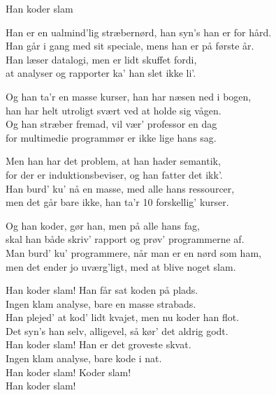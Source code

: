 \begin{song}{Han koder slam}
  \begin{SBVerse}
    Han er en ualmind'lig stræbernørd, han syn's han er for hård.\\
    Han går i gang med sit speciale, mens han er på første år.\\
    Han læser datalogi, men er lidt skuffet fordi,\\
    at analyser og rapporter ka' han slet ikke li'.
  \end{SBVerse}

  \begin{SBVerse}
    Og han ta'r en masse kurser, han har næsen ned i bogen,\\
    han har helt utroligt svært ved at holde sig vågen.\\
    Og han stræber fremad, vil vær' professor en dag\\
    for multimedie programmør er ikke lige hans sag.
  \end{SBVerse}

  \begin{SBVerse}
    Men han har det problem, at han hader semantik,\\
    for der er induktionsbeviser, og han fatter det ikk'.\\
    Han burd' ku' nå en masse, med alle hans ressourcer,\\
    men det går bare ikke, han ta'r 10 forskellig' kurser.
  \end{SBVerse}

  \begin{SBVerse}
    Og han koder, gør han, men på alle hans fag,\\
    skal han både skriv' rapport og prøv' programmerne af.\\
    Man burd' ku' programmere, når man er en nørd som ham,\\
    men det ender jo uværg'ligt, med at blive noget slam.
  \end{SBVerse}

  \begin{SBChorus}
    Han koder slam! Han får sat koden på plads.\\
    Ingen klam analyse, bare en masse strabads.\\
    Han plejed' at kod' lidt kvajet, men nu koder han flot.\\
    Det syn's han selv, alligevel, så kør' det aldrig godt.\\
    Han koder slam! Han er det groveste skvat.\\
    Ingen klam analyse, bare kode i nat.\\
    Han koder slam! Koder slam!\\
    Han koder slam!
  \end{SBChorus}


\end{song}
